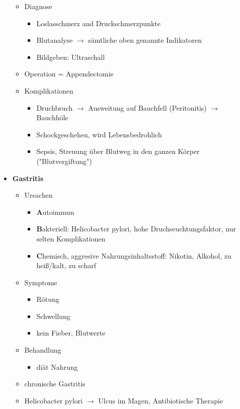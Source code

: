 \begin{itemize}
\begin{itemize}
\begin{itemize}
						 \end{itemize}
					\item Diagnose
						\begin{itemize}
							\item Loslasschmerz and Druckschmerzpunkte
							\item Blutanalyse $\rightarrow$ sämtliche oben genannte Indikatoren
							\item Bildgeben: Ultraschall
						\end{itemize}
					\item Operation = Appendectomie
					\item Komplikationen
					\begin{itemize}
						\item Druchbruch $\rightarrow$ Ausweitung auf Bauchfell (Peritonitis) $\rightarrow$ Bauchhöle 
						\item Schockgeschehen, wird Lebensbedrohlich
						\item Sepsis, Streuung über Blutweg in den ganzen Körper ("Blutvergiftung")
					\end{itemize}
				\end{itemize}
			\item \textbf{Gastritis}
				\begin{itemize}
					\item Ursachen
						\begin{itemize}
							\item \textbf{A}utoimmun
							\item \textbf{B}akteriell: Helicobacter pylori, hohe Druchseuchtungsfaktor, nur selten Komplikationen
							\item \textbf{C}hemisch, aggresive Nahrungsinhaltsstoff: Nikotin, Alkohol, zu heiß/kalt, zu scharf
						\end{itemize}
					\item Symptome
						\begin{itemize}
							\item Rötung
							\item Schwellung
							\item kein Fieber, Blutwerte
						\end{itemize}
					\item Behandlung
						\begin{itemize}
							\item diät Nahrung
						\end{itemize}
					\item chronische Gastritis
					\item Helicobacter pylori $\rightarrow$ Ulcus im Magen, Antibiotische Therapie

\end{itemize}
\end{itemize}
